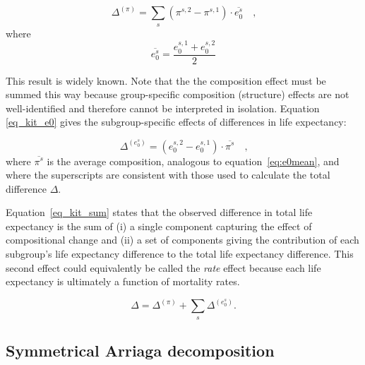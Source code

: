 \documentclass[12pt, sn-apa,pdflatex,letterpaper]{sn-jnl}
\begin{document}
\begin{equation}
\label{eq_kit_comp}
\Delta^{(\pi)} = \sum_s \left(\pi^{s,2}- \pi^{s,1}\right) \cdot \overline{e_0^s}\quad \textrm{,}
\end{equation}
 where 
 \begin{equation}\label{eq:e0mean}
     \overline{e_0^s} = \frac{e_0^{s,1} + e_0^{s,2}}{2} 
 \end{equation}

\noindent This result is widely known. Note that the the composition effect must be summed this way because group-specific composition (structure) effects are not well-identified and therefore cannot be interpreted in isolation. Equation \eqref{eq_kit_e0} gives the subgroup-specific effects of differences in life expectancy:

\begin{equation}
\label{eq_kit_e0}
\Delta^{(e_0^s)} = \left(e_0^{s,2} - e_0^{s,1}\right) \cdot \overline{\pi^s}\quad \textrm{,}
\end{equation}
where $\overline{\pi^s}$ is the average composition, analogous to equation~\eqref{eq:e0mean}, and where the superscripts are consistent with those used to calculate the total difference $\Delta$.

Equation~\eqref{eq_kit_sum} states that the observed difference in total life expectancy is the sum of (i) a single component capturing the effect of compositional change and (ii) a set of components giving the contribution of each subgroup's life expectancy difference to the total life expectancy difference. This second effect could equivalently be called the \textit{rate} effect because each life expectancy is ultimately a function of mortality rates.

\begin{equation}
\label{eq_kit_sum}
\Delta = \Delta^{(\pi)}  + \sum_s \Delta^{(e_0^s)}\textrm{.}
\end{equation}


\subsection*{Symmetrical Arriaga
decomposition}\label{symmetrical-arriaga-decomposition}
\end{document}
